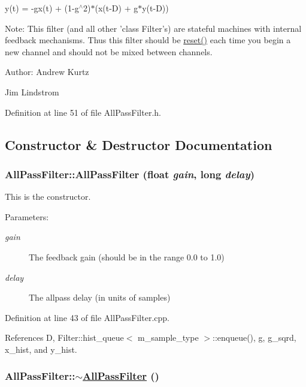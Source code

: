 y(t) = -gx(t) + (1-g$^\wedge$2)$\ast$(x(t-D) + g$\ast$y(t-D))

\begin{Desc}
\item[Note:]This filter (and all other 'class Filter's) are stateful machines with internal feedback mechanisms. Thus this filter should be \hyperlink{classAllPassFilter_a3}{reset()} each time you begin a new channel and should not be mixed between channels. \end{Desc}
\begin{Desc}
\item[Author:]Andrew Kurtz 

Jim Lindstrom \end{Desc}




Definition at line 51 of file All\-Pass\-Filter.h.

\subsection{Constructor \& Destructor Documentation}
\hypertarget{classAllPassFilter_a0}{
\subsubsection[AllPassFilter]{\setlength{\rightskip}{0pt plus 5cm}All\-Pass\-Filter::All\-Pass\-Filter (float {\em gain}, long {\em delay})}}
\label{classAllPassFilter_a0}


This is the constructor. \begin{Desc}
\item[Parameters:]
\begin{description}
\item[{\em gain}]The feedback gain (should be in the range 0.0 to 1.0) \item[{\em delay}]The allpass delay (in units of samples) \end{description}
\end{Desc}


Definition at line 43 of file All\-Pass\-Filter.cpp.

References D, Filter::hist\_\-queue$<$ m\_\-sample\_\-type $>$::enqueue(), g, g\_\-sqrd, x\_\-hist, and y\_\-hist.\hypertarget{classAllPassFilter_a1}{
\subsubsection[$\sim$AllPassFilter]{\setlength{\rightskip}{0pt plus 5cm}All\-Pass\-Filter::$\sim$\hyperlink{classAllPassFilter}{All\-Pass\-Filter} ()}}
\label{classAllPassFilter_a1}


